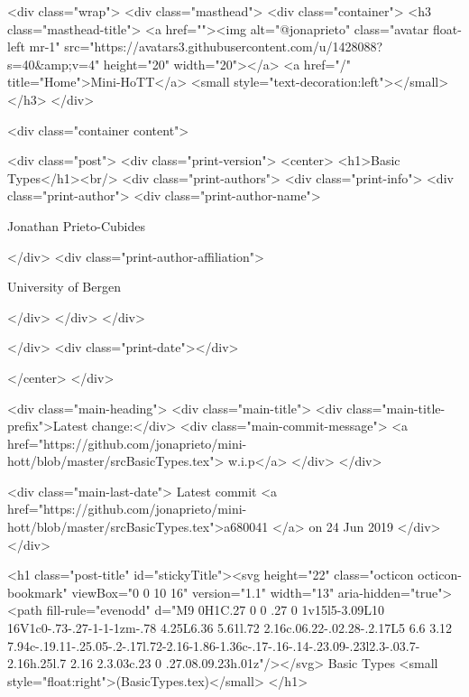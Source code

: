    <div class="wrap">
      <div class="masthead">
        <div class="container">
          <h3 class="masthead-title">
            <a href=""><img alt="@jonaprieto" class="avatar float-left mr-1" src="https://avatars3.githubusercontent.com/u/1428088?s=40&amp;v=4" height="20" width="20"></a>
            <a href="/" title="Home">Mini-HoTT</a>
            <small style="text-decoration:left"></small>
          </h3>
        </div>
      
      <div class="container content">
        







<div class="post">
  <div class="print-version">
    <center>
      <h1>Basic Types</h1><br/>
        <div class="print-authors">
          <div class="print-info">
            <div class="print-author">
              <div class="print-author-name">
                
                  Jonathan Prieto-Cubides
                
              </div>
              <div class="print-author-affiliation">
                
                  University of Bergen
                
                </div>
            </div>
          </div>
          
          
        </div>
        <div class="print-date"></div>
        
        
    </center>
  </div>

  
  <div class="main-heading">
    <div class="main-title">
      <div class="main-title-prefix">Latest change:</div>
      <div class="main-commit-message">
            <a href="https://github.com/jonaprieto/mini-hott/blob/master/srcBasicTypes.tex">
              w.i.p</a>
      </div>
    </div>

    <div class="main-last-date">
      Latest commit <a href="https://github.com/jonaprieto/mini-hott/blob/master/srcBasicTypes.tex">a680041 </a> on  24 Jun 2019
    </div>
  </div>
  

  <h1 class="post-title" id="stickyTitle"><svg height="22" class="octicon octicon-bookmark" viewBox="0 0 10 16" version="1.1" width="13" aria-hidden="true"><path fill-rule="evenodd" d="M9 0H1C.27 0 0 .27 0 1v15l5-3.09L10 16V1c0-.73-.27-1-1-1zm-.78 4.25L6.36 5.61l.72 2.16c.06.22-.02.28-.2.17L5 6.6 3.12 7.94c-.19.11-.25.05-.2-.17l.72-2.16-1.86-1.36c-.17-.16-.14-.23.09-.23l2.3-.03.7-2.16h.25l.7 2.16 2.3.03c.23 0 .27.08.09.23h.01z"/></svg> Basic Types <small style="float:right">(BasicTypes.tex)</small>
  </h1>


